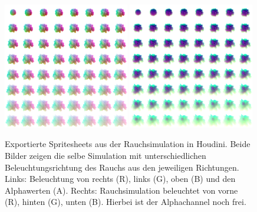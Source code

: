 \begin{figure}[h!t]
	\centering
	\includegraphics[width=0.49\textwidth]{Grafiken/Implementation/Explo_T1_8x8.png}
	\includegraphics[width=0.49\textwidth]{Grafiken/Implementation/Explo_T2_8x8.png}
	\begin{footnotesize}
		\caption{Exportierte Spritesheets aus der Rauchsimulation in Houdini. Beide Bilder zeigen die selbe Simulation mit unterschiedlichen Beleuchtungsrichtung des Rauchs aus 
        den jeweiligen Richtungen. Links: Beleuchtung von rechts (R), links (G), oben (B) und den Alphawerten (A). 
        Rechts: Rauchsimulation beleuchtet von vorne (R), hinten (G), unten (B). Hierbei ist der Alphachannel noch frei.}
	\end{footnotesize}
\end{figure}



